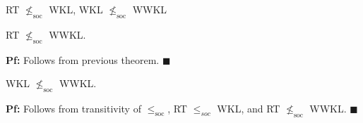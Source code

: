 \begin{frame}{RT $\nleq_{\text{soc}}$ WKL, WKL $\nleq_{\text{soc}}$ WWKL}
  \begin{coro}
    \label{coro:rt-wwkl}
    RT $\nleq_{\text{soc}}$ WWKL.
  \end{coro}
  \textbf{Pf:} Follows from previous theorem. $\blacksquare$

  \vspace{2em}
  \begin{coro}
    WKL $\nleq_{\text{soc}}$ WWKL.
  \end{coro}
  \textbf{Pf:} Follows from transitivity of $\leq_\text{soc}$,
  RT $\leq_{soc}$ WKL, and RT $\nleq_{\text{soc}}$ WWKL. $\blacksquare$
\end{frame}
